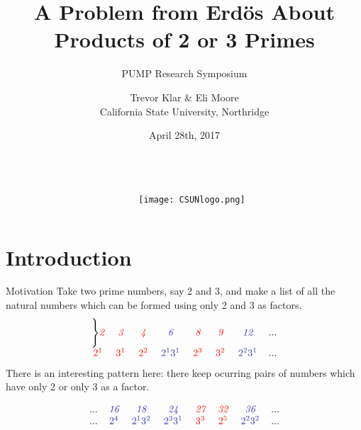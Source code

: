 \documentclass{beamer}
\title{A Problem from Erd\"os About Products of 2 or 3 Primes}
\subtitle{PUMP Research Symposium}
\author{Trevor Klar \& Eli Moore \\ California State University, Northridge}
\date{April 28th, 2017}
\newcommand{\redtext}[1]{{\textcolor{red}{#1}}}
\newcommand{\bluetext}[1]{{\textcolor{dblue}{#1}}}
\newcommand{\remph}[1]{\redtext{\textit{#1}}}
\newcommand{\blemph}[1]{\bluetext{\textit{#1}}}
\begin{document}
\begin{frame}
    \titlepage
    \begin{columns}
        \begin{column}{.8\textwidth}
        \end{column}
        
        \begin{column}{.2\textwidth}
            \texttt{[image: CSUNlogo.png]}
        \end{column}
    \end{columns}
\end{frame}
\section{Introduction}
\begin{frame}{Motivation}
    Take two prime numbers, say 2 and 3, and make a list of all the natural numbers which can be formed using only 2 and 3 as factors.
    \[\begin{array}{ ccccccccccccccc }
\Bigg\}\remph{2} & \remph{3} & \remph{4} & \blemph{6} & \remph{8} & \remph{9} & \blemph{12} & ... \\
\remph{\,$2^1$\,} & \remph{\,$3^1$\,} & \remph{\,$2^2$\,} & \blemph{\,$2^13^1$\,} & \remph{\,$2^3$\,} & \remph{\,$3^2$\,} & \blemph{\,$2^23^1$\,} & ...
\end{array}\]
    There is an interesting pattern here: there keep ocurring pairs of numbers which have only 2 or only 3 as a factor. 

\[\begin{array}{ ccccccccccccccc }
... & \blemph{16} & \blemph{18} & \blemph{24} & \remph{27} & \remph{32} & \blemph{36} & ...\\
... & \blemph{\,$2^4$\,} & \blemph{\,$2^13^2$\,} & \blemph{\,$2^33^1$\,} & \remph{\,$3^3$\,} & \remph{\,$2^5$\,} & \blemph{\,$2^23^2$\,} & ...
\end{array}\]
\end{frame}
\end{document}
